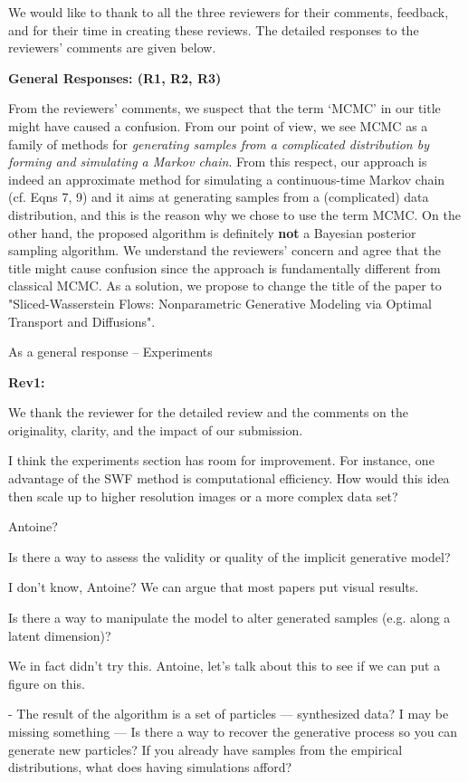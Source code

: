 \documentclass{article}
\newcommand{\rev}[1]{{\color{red} #1}}
\newcommand{\umut}[1]{{\color{blue} #1}}
\begin{document}
We would like to thank to all the three reviewers for their comments, feedback, and for their time in creating these reviews. The detailed responses to the reviewers' comments are given below.

\textbf{General Responses: (R1, R2, R3)}

From the reviewers' comments, we suspect that the term `MCMC' in our title might have caused a confusion. From our point of view, we see MCMC as a family of methods for \emph{generating samples from a complicated distribution by forming and simulating a Markov chain}. From this respect, our approach is indeed an approximate method for simulating a continuous-time Markov chain (cf. Eqns 7, 9) and it aims at generating samples from a (complicated) data distribution, and this is the reason why we chose to use the term MCMC. On the other hand, the proposed algorithm is definitely \textbf{not} a Bayesian posterior sampling algorithm. We understand the reviewers' concern and agree that the title might cause confusion since the approach is fundamentally different from classical MCMC. As a solution, we propose to change the title of the paper to "Sliced-Wasserstein Flows: Nonparametric Generative Modeling via Optimal Transport and Diffusions".

\umut{As a general response -- Experiments}

\textbf{Rev1: }

We thank the reviewer for the detailed review and the comments on the originality, clarity, and the impact of our submission.  

\rev{I think the experiments section has room for improvement. For instance, one advantage of the SWF method is computational efficiency. How would this idea then scale up to higher resolution images or a more complex data set?}

\umut{Antoine?}

\rev{Is there a way to assess the validity or quality of the implicit generative model?}

\umut{I don't know, Antoine? We can argue that most papers put visual results.}

\rev{Is there a way to manipulate the model to alter generated samples (e.g. along a latent dimension)?}

\umut{We in fact didn't try this. Antoine, let's talk about this to see if we can put a figure on this.}

\rev{- The result of the algorithm is a set of particles — synthesized data? I may be missing something — Is there a way to recover the generative process so you can generate new particles? If you already have samples from the empirical distributions, what does having simulations afford?}
\end{document}

